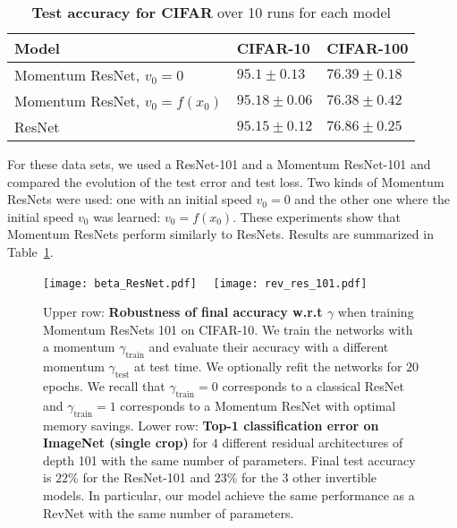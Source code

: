 \documentclass{article}
\begin{document}
\begin{table}[H]
\vskip -0.15in
\centering
\caption{\label{tab:results_CIFAR}\textbf{Test accuracy for CIFAR} over 10 runs for each model}
\vskip 0.15in
\begin{adjustbox}{width=\columnwidth,center}
\begin{tabular}{|l|l|l|}
  \hline
  \textbf{Model} & \textbf{CIFAR-10} & \textbf{CIFAR-100} \\ \hline
  {Momentum ResNet, $v_0 = 0$} & {$95.1 \pm 0.13$} & {$76.39 \pm 0.18$} \\ \hline
  {Momentum ResNet, $v_0 = f(x_0)$} & $95.18 \pm 0.06$ & $76.38 \pm 0.42 $ \\ \hline
  {ResNet} & $95.15 \pm 0.12$ & $76.86 \pm 0.25$ \\ \hline
\end{tabular}
\end{adjustbox}

\end{table}


For these data sets,
we used a ResNet-101 \citep{he2015deep} and a Momentum ResNet-101 and compared the evolution of the test error and test loss. Two kinds of Momentum ResNets were used: one with an initial speed $v_0 = 0$ and the other one where the initial speed $v_0$ was learned: $v_0 = f(x_0)$. These experiments show that Momentum ResNets perform similarly to ResNets. Results are summarized in Table~\ref{tab:results_CIFAR}.


 






\begin{figure*}[ht]
 \centering
\texttt{[image: beta\_ResNet.pdf]} 
 \unskip\ \vrule\
 \texttt{[image: rev\_res\_101.pdf]} 
 \caption{Upper row: \textbf{Robustness of final accuracy w.r.t $\gamma$} when training Momentum ResNets 101 on CIFAR-10. We train the networks with a momentum $\gamma_{\mathrm{train}}$ and evaluate their accuracy with a different momentum $\gamma_\mathrm{test}$ at test time. We optionally refit the networks for $20$ epochs. We recall that $\gamma_{\mathrm{train}} = 0$ corresponds to a classical ResNet and $\gamma_{\mathrm{train}} = 1$ corresponds to a Momentum ResNet with optimal memory savings.
Lower row: \textbf{Top-1 classification error on ImageNet (single crop)} for $4$ different residual architectures of depth 101 with the same number of parameters. Final test accuracy is $22 \%$ for the ResNet-101 and $23 \%$ for the $3$ other invertible models.  In particular, our model achieve the same performance as a RevNet with the same number of parameters.}
\label{fig:beta_learning_curves}
\vspace{-1em}
 \end{figure*}
 
\end{document}
